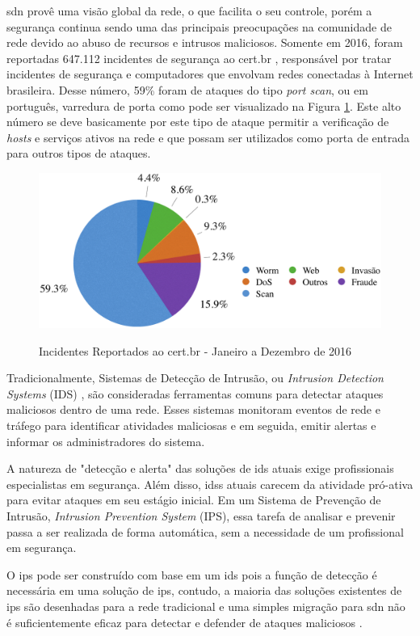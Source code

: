 \gls{sdn} provê uma visão global da rede, o que facilita o seu controle, porém a segurança continua sendo uma das principais preocupações na comunidade de rede devido ao abuso de recursos e intrusos maliciosos. Somente em 2016, foram reportadas 647.112 incidentes de segurança ao \gls{cert.br} \cite{certbr}, responsável por tratar incidentes de segurança e computadores que envolvam redes conectadas à Internet brasileira. Desse número, 59\% foram de ataques do tipo \textit{port scan}, ou em português, varredura de porta como pode ser visualizado na Figura \ref{fig:certbr}. Este alto número se deve basicamente por este tipo de ataque permitir a verificação de \textit{hosts} e serviços ativos na rede e que possam ser utilizados como porta de entrada para outros tipos de ataques.

\begin{figure}[H]
  \centering
  \caption{Incidentes Reportados ao \gls{cert.br} - Janeiro a Dezembro de 2016}
  \includegraphics[width=.8\textwidth]{images/cert.eps}
  \label{fig:certbr}
\end{figure}
\FloatBarrier

Tradicionalmente, Sistemas de Detecção de Intrusão, ou \textit{Intrusion Detection Systems} (IDS) \cite{Comer:2013}, são consideradas ferramentas comuns para detectar ataques maliciosos dentro de uma rede. Esses sistemas monitoram eventos de rede e tráfego para identificar atividades maliciosas e em seguida, emitir alertas e informar os administradores do sistema. 

A natureza de "detecção e alerta" das soluções de \gls{ids} atuais exige profissionais especialistas em segurança. Além disso, \glspl{ids} atuais carecem da atividade pró-ativa para evitar ataques em seu estágio inicial. Em um Sistema de Prevenção de Intrusão, \textit{Intrusion Prevention System} (IPS), essa tarefa de analisar e prevenir passa a ser realizada de forma automática, sem a necessidade de um profissional em segurança.

O \gls{ips} pode ser construído com base em um \gls{ids} pois a função de detecção é necessária em uma solução de \gls{ips}, contudo, a maioria das soluções existentes de \gls{ips} são desenhadas para a rede tradicional e uma simples migração para \gls{sdn} não é suficientemente eficaz para detectar e defender de ataques maliciosos \cite{Xiong:2014}.

